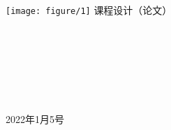 \documentclass[12pt,oneside,a4paper,fleqn]{ctexart}
\begin{document}
    \begin{titlepage}
        \heiti
        \ 
        \vspace{3em}
        \begin{center}
            \texttt{[image: figure/1]}\newline
            {课程设计（论文）}\\
            \vspace{15em}
            \noindent{}\ \ \underline{}\\
            \vspace{1em}
            \ \ \underline{}\\
            \vspace{1em}
            \ \ \underline{}\\
            \vspace{1em}
            \ \ \underline{}\\
            \vspace{1em}
            \ \ \underline{}\\
            \vspace{1em}
            \ \ \underline{}\\
            \vspace{1em}
            \ \ \underline{}\\
            \vspace{10em}
            {2022年1月5号}
        \end{center}
    \end{titlepage}
\newpage

\begin{abstract}
    \thispagestyle{empty}
    \songti
    \begin{spacing}{1.25}
        摘要又称概要、内容提要，意思是摘录要点或摘录下来的要点。 [1]  摘要是以提供文献内容梗概为目的，不加评论和补充解释，简明、确切地记述文献重要内容的短文。其基本要素包括研究目的、方法、结果和结论。具体地讲就是研究工作的主要对象和范围，采用的手段和方法，得出的结果和重要的结论，有时也包括具有情报价值的其它重要的信息。
        \newline
        \newline
        \textbf{关键字：}{$\times \times \times $}
    \end{spacing}
\end{abstract}
\end{document}
